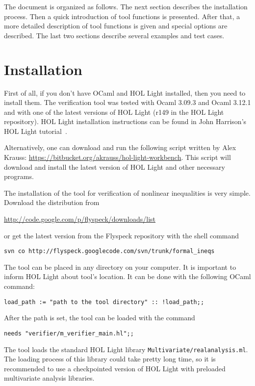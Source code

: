 \documentclass[a4paper]{article}
\begin{document}
The document is organized as follows. The next section describes the installation process. Then a quick introduction of tool functions is presented. After that, a more detailed description of tool functions is given and special options are described. The last two sections describe several examples and test cases.


\section{Installation}
First of all, if you don't have OCaml and HOL Light installed, then you need to install them. The verification tool was tested with Ocaml 3.09.3 and Ocaml 3.12.1 and with one of the latest versions of HOL Light (r149 in the HOL Light repository).  HOL Light installation instructions can be found in John Harrison's HOL Light tutorial~\cite{HOL-tutorial}.

Alternatively, one can download and run the following script written by Alex Krauss: \url{https://bitbucket.org/akrauss/hol-light-workbench}. This script will download and install the latest version of HOL Light and other necessary programs.

The installation of the tool for verification of nonlinear inequalities is very simple. Download the distribution from

\vspace{-5pt}
\url{http://code.google.com/p/flyspeck/downloads/list}

\vspace{-5pt}
or get the latest version from the Flyspeck repository with the shell command

\vspace{-5pt}
\verb|svn co http://flyspeck.googlecode.com/svn/trunk/formal_ineqs|


The tool can be placed in any directory on your computer. It is important to inform HOL Light about tool's location. It can be done with the following OCaml command:

\verb|load_path := "path to the tool directory" :: !load_path;;|

After the path is set, the tool can be loaded with the command

\verb|needs "verifier/m_verifier_main.hl";;|

The tool loads the standard HOL Light library \verb|Multivariate/realanalysis.ml|. The loading process of this library could take pretty long time, so it is recommended to use a checkpointed version of HOL Light with preloaded multivariate analysis libraries.
\end{document}
